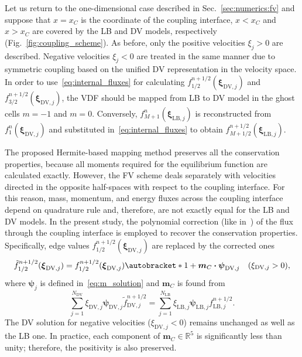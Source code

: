 \documentclass{elsarticle} %
\DeclarePairedDelimiter\autobracket()       %
\newcommand{\br}[1]{\autobracket*{#1}}
\newcommand{\bxi}{\boldsymbol{\xi}}
\newcommand{\bpsi}{\boldsymbol{\psi}}
\newcommand{\bm}{\boldsymbol{m}}
\newcommand{\bdot}{\boldsymbol{\cdot}}
\newcommand{\LB}{\mathrm{LB}}
\newcommand{\DV}{\mathrm{DV}}
\begin{document}
Let us return to the one-dimensional case described in Sec.~\ref{sec:numerics:fv}
and suppose that \(x=x_C\) is the coordinate of the coupling interface,
\(x<x_C\) and \(x>x_C\) are covered by the LB and DV models, respectively (Fig.~\ref{fig:coupling_scheme}).
As before, only the positive velocities \(\xi_j>0\) are described.
Negative velocities \(\xi_j<0\) are treated in the same manner due to
symmetric coupling based on the unified DV representation in the velocity space.
In order to use~\eqref{eq:internal_fluxes} for calculating \(f^{n+1/2}_{1/2}(\bxi_{\DV,j})\)
and \(f^{n+1/2}_{3/2}(\bxi_{\DV,j})\),
the VDF should be mapped from LB to DV model in the ghost cells \(m=-1\) and \(m=0\).
Conversely, \(f^n_{M+1}(\bxi_{\LB,j})\) is reconstructed from \(f^n_1(\bxi_{\DV,j})\)
and substituted in~\eqref{eq:internal_fluxes} to obtain \(f^{n+1/2}_{M+1/2}(\bxi_{\LB,j})\).

The proposed Hermite-based mapping method preserves all the conservation properties,
because all moments required for the equilibrium function are calculated exactly.
However, the FV scheme deals separately with velocities
directed in the opposite half-spaces with respect to the coupling interface.
For this reason, mass, momentum, and energy fluxes across the coupling interface
depend on quadrature rule and, therefore, are not exactly equal for the LB and DV models.
In the present study, the polynomial correction (like in~\cite{Aristov1980})
of the flux through the coupling interface is employed to recover the conservation properties.
Specifically, edge values \(f^{n+1/2}_{1/2}(\bxi_{\DV,j})\) are replaced by the corrected ones
\begin{equation}\label{eq:poly_correction}
    \tilde{f}^{n+1/2}_{1/2}(\bxi_{\DV,j}) = f^{n+1/2}_{1/2}(\bxi_{\DV,j}) \br{ 1 + \bm_C\bdot\bpsi_{\DV,j} }
        \quad (\xi_{\DV,j} > 0),
\end{equation}
where \(\bpsi_j\) is defined in~\eqref{eq:m_solution} and \(\bm_C\) is found from
\begin{equation}\label{eq:m_correction}
    \sum_{j=1}^{N_{\DV}} \xi_{\DV,j} \bpsi_{\DV,j} \tilde{f}^{n+1/2}_{\DV,j} =
        \sum_{j=1}^{N_{\LB}} \xi_{\LB,j} \bpsi_{\LB,j} f^{n+1/2}_{\LB,j}.
\end{equation}
The DV solution for negative velocities (\(\xi_{\DV,j} < 0\)) remains unchanged as well as the LB one.
In practice, each component of \(\bm_C\in\mathbb{R}^5\) is significantly less than unity;
therefore, the positivity is also preserved.
\end{document}
